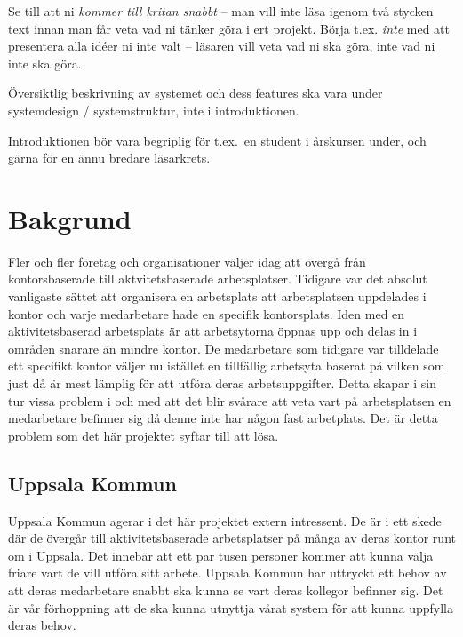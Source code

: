 \documentclass[a4paper,12pt]{article}
\begin{document}
Se till att ni \emph{kommer till kritan snabbt} – man vill inte läsa igenom två stycken text innan man får veta vad ni tänker göra i ert projekt.  Börja t.ex. \emph{inte} med att presentera alla idéer ni inte valt – läsaren vill veta vad ni ska göra, inte vad ni inte ska göra.

Översiktlig beskrivning av systemet och dess features ska vara under systemdesign / systemstruktur, inte i introduktionen.

Introduktionen bör vara begriplig för t.ex.~en student i årskursen under, och gärna för en ännu bredare läsarkrets.

\section{Bakgrund}
Fler och fler företag och organisationer väljer idag att övergå från kontorsbaserade till aktvitetsbaserade
arbetsplatser. Tidigare var det absolut vanligaste sättet att organisera en arbetsplats att arbetsplatsen uppdelades i kontor och varje medarbetare hade en specifik kontorsplats.
Iden med en aktivitetsbaserad arbetsplats är att arbetsytorna öppnas upp och delas in i områden snarare än mindre kontor. De medarbetare som tidigare var tilldelade ett specifikt kontor
väljer nu istället en tillfällig arbetsyta baserat på vilken som just då
är mest lämplig för att utföra deras arbetsuppgifter.
\bigskip
\newline
Detta skapar i sin tur vissa problem i och med att det blir svårare att veta vart på arbetsplatsen en medarbetare befinner sig då denne inte har någon fast arbetplats.
Det är detta problem som det här projektet syftar till att lösa.

	\subsection{Uppsala Kommun}
  Uppsala Kommun agerar i det här projektet extern intressent. De är i ett skede där de övergår till aktivitetsbaserade arbetsplatser på många av deras kontor runt om i Uppsala. Det innebär att %
  ett par tusen personer kommer att kunna välja friare vart de vill utföra sitt arbete. Uppsala Kommun har uttryckt ett behov av att deras medarbetare snabbt ska kunna se vart deras kollegor befinner sig. Det är vår förhoppning att de ska kunna utnyttja vårat system för att kunna uppfylla deras behov.
\end{document}
